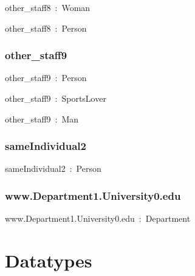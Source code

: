 \documentclass{article}
\begin{document}
other\_staff8~:~Woman

other\_staff8~:~Person

\subsubsection*{other\_staff9}

other\_staff9~:~Person

other\_staff9~:~SportsLover

other\_staff9~:~Man

\subsubsection*{sameIndividual2}

sameIndividual2~:~Person

\subsubsection*{www.Department1.University0.edu}

www.Department1.University0.edu~:~Department

\section*{Datatypes}
\end{document}
